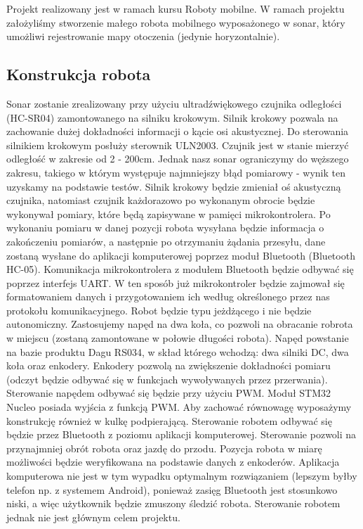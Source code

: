 Projekt realizowany jest w ramach kursu Roboty mobilne. W ramach projektu założyliśmy stworzenie małego robota mobilnego wyposażonego w sonar, który umożliwi rejestrowanie mapy otoczenia (jedynie horyzontalnie).
\subsection{Konstrukcja robota}
Sonar zostanie zrealizowany przy użyciu ultradźwiękowego czujnika odległości (HC-SR04) zamontowanego na silniku krokowym. Silnik krokowy pozwala na zachowanie dużej dokładności informacji o kącie osi akustycznej. Do sterowania silnikiem krokowym posłuży sterownik ULN2003. Czujnik jest w stanie mierzyć odległość w zakresie od 2 - 200cm. Jednak nasz sonar ograniczymy do węższego zakresu, takiego w którym występuje najmniejszy błąd pomiarowy - wynik ten uzyskamy na podstawie testów. Silnik krokowy będzie zmieniał oś akustyczną czujnika, natomiast czujnik każdorazowo po wykonanym obrocie będzie wykonywał pomiary, które będą zapisywane w pamięci mikrokontrolera. Po wykonaniu pomiaru w danej pozycji robota wysyłana będzie informacja o zakończeniu pomiarów, a następnie po otrzymaniu żądania przesyłu, dane zostaną wysłane do aplikacji komputerowej poprzez moduł Bluetooth (Bluetooth HC-05). Komunikacja mikrokontrolera z modułem Bluetooth będzie odbywać się poprzez interfejs UART. W ten sposób już mikrokontroler będzie zajmował się formatowaniem danych i przygotowaniem ich według określonego przez nas protokołu komunikacyjnego. \newline 
Robot będzie typu jeżdżącego i nie będzie autonomiczny. Zastosujemy napęd na dwa koła, co pozwoli na obracanie robrota w miejscu (zostaną zamontowane w połowie długości robota). Napęd powstanie na bazie produktu Dagu RS034, w skład którego wchodzą: dwa silniki DC, dwa koła oraz enkodery. Enkodery pozwolą na zwiększenie dokładności pomiaru (odczyt będzie odbywać się w funkcjach wywoływanych przez przerwania). Sterowanie napędem odbywać się będzie przy użyciu PWM. Moduł STM32 Nucleo posiada wyjścia z funkcją PWM. Aby zachować równowagę wyposażymy konstrukcję również w kulkę podpierającą. Sterowanie robotem odbywać się będzie przez Bluetooth z poziomu aplikacji komputerowej. Sterowanie pozwoli na przynajmniej obrót robota oraz jazdę do przodu. Pozycja robota w miarę możliwości będzie weryfikowana na podstawie danych z enkoderów. Aplikacja komputerowa nie jest w tym wypadku optymalnym rozwiązaniem (lepszym byłby telefon np. z systemem Android), ponieważ zasięg Bluetooth jest stosunkowo niski, a więc użytkownik będzie zmuszony śledzić robota. Sterowanie robotem jednak nie jest głównym celem projektu.
